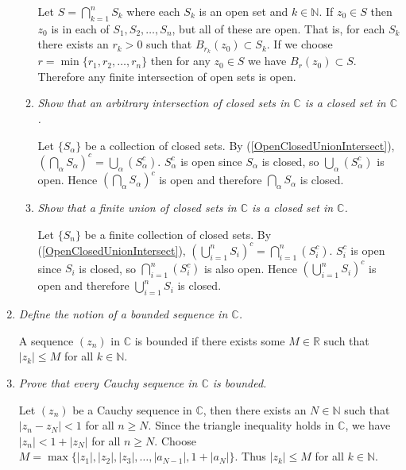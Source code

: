\documentclass[11pt]{article}
\begin{document}
\begin{enumerate}
\begin{enumerate}
Let $S = \bigcap_{k=1}^nS_k$ where each $S_k$ is an open set and $k \in \mathbb{N}$.  If $z_0 \in S$ then $z_0$ is in each of $S_1,S_2,\ldots,S_n$, but all of these are open.  That is, for each $S_k$ there exists an $r_k > 0$ such that $B_{r_k}(z_0) \subset S_k$.  If we choose $r = \min\{r_1,r_2,\ldots,r_n\}$ then for any $z_0 \in S$ we have $B_r(z_0) \subset S$.  Therefore any finite intersection of open sets is open.

\item \emph{Show that an arbitrary intersection of closed sets in $\mathbb{C}$ is a closed set in $\mathbb{C}$.}

Let $\{S_\alpha\}$ be a collection of closed sets.  By (\ref{OpenClosedUnionIntersect}), $\left(\bigcap_\alpha S_\alpha \right)^c = \bigcup_\alpha \left(S_\alpha^c\right)$.  $S_\alpha^c$ is open since $S_\alpha$ is closed, so  $\bigcup_\alpha \left(S_\alpha^c\right)$ is open.  Hence $\left(\bigcap_\alpha S_\alpha \right)^c$ is open and therefore $\bigcap_\alpha S_\alpha$ is closed.

\item \emph{Show that a finite union of closed sets in $\mathbb{C}$ is a closed set in $\mathbb{C}$.}

Let $\{S_n\}$ be a finite collection of closed sets.  By (\ref{OpenClosedUnionIntersect}), $\left(\bigcup_{i=1}^n S_i \right)^c = \bigcap_{i=1}^n \left(S_i^c\right)$.  $S_i^c$ is open since $S_i$ is closed, so $\bigcap_{i=1}^n \left(S_i^c\right)$ is also open.  Hence $\left(\bigcup_{i=1}^n S_i \right)^c$ is open and therefore $\bigcup_{i=1}^n S_i$ is closed.

\end{enumerate}

\item \emph{Define the notion of a bounded sequence in $\mathbb{C}$.}

A sequence $(z_n)$ in $\mathbb{C}$ is bounded if there exists some $M \in \mathbb{R}$ such that $|z_k| \leq M$ for all $k \in \mathbb{N}$.

\item \emph{Prove that every Cauchy sequence in $\mathbb{C}$ is bounded.}

Let $(z_n)$ be a Cauchy sequence in $\mathbb{C}$, then there exists an $N \in \mathbb{N}$ such that $|z_n - z_N| < 1$ for all $n \geq N$.  Since the triangle inequality holds in $\mathbb{C}$, we have $|z_n| < 1 + |z_N|$ for all $n \geq N$.  Choose $M = \max\{|z_1|,|z_2|,|z_3|,\ldots,|a_{N-1}|, 1+|a_N|\}$.  Thus $|z_k| \leq M$ for all $k \in \mathbb{N}$.


\end{enumerate}
\end{document}
